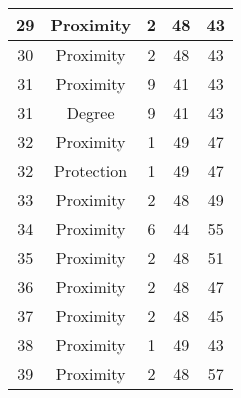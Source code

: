 \documentclass[results.tex]{subfiles}
\begin{document}
\begin{center}
\begin{tabular}{| c || c | c | c | c |}
            \hline
            29                      & Proximity                    & 2                      & 48                      & 43                   \\
            \hline
            30                      & Proximity                    & 2                      & 48                      & 43                   \\
            \hline
            31                      & Proximity                    & 9                      & 41                      & 43                   \\
            \hline
            31                      & Degree                       & 9                      & 41                      & 43                   \\
            \hline
            32                      & Proximity                    & 1                      & 49                      & 47                   \\
            \hline
            32                      & Protection                   & 1                      & 49                      & 47                   \\
            \hline
            33                      & Proximity                    & 2                      & 48                      & 49                   \\
            \hline
            34                      & Proximity                    & 6                      & 44                      & 55                   \\
            \hline
            35                      & Proximity                    & 2                      & 48                      & 51                   \\
            \hline
            36                      & Proximity                    & 2                      & 48                      & 47                   \\
            \hline
            37                      & Proximity                    & 2                      & 48                      & 45                   \\
            \hline
            38                      & Proximity                    & 1                      & 49                      & 43                   \\
            \hline
            39                      & Proximity                    & 2                      & 48                      & 57                   \\

\end{tabular}
\end{center}
\end{document}
